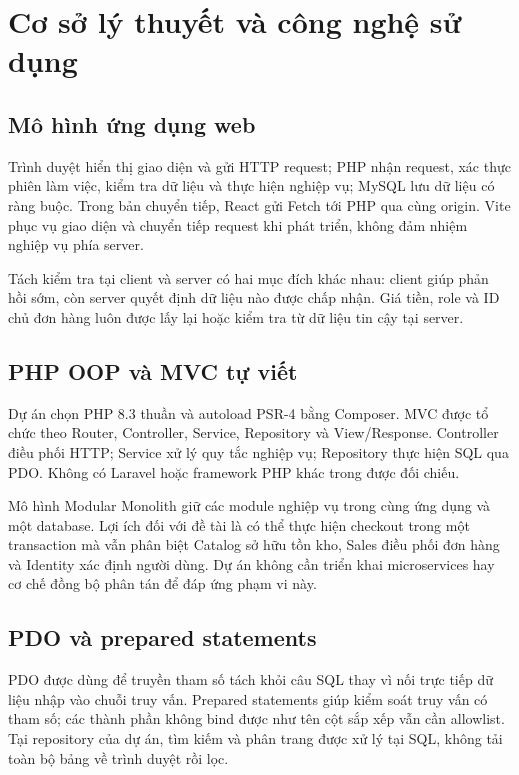 \section{Cơ sở lý thuyết và công nghệ sử dụng}
\subsection{Mô hình ứng dụng web}
Trình duyệt hiển thị giao diện và gửi HTTP request; PHP nhận request, xác thực phiên làm việc, kiểm tra dữ liệu và thực hiện nghiệp vụ; MySQL lưu dữ liệu có ràng buộc. Trong bản chuyển tiếp, React gửi Fetch tới PHP qua cùng origin. Vite phục vụ giao diện và chuyển tiếp request khi phát triển, không đảm nhiệm nghiệp vụ phía server.

Tách kiểm tra tại client và server có hai mục đích khác nhau: client giúp phản hồi sớm, còn server quyết định dữ liệu nào được chấp nhận. Giá tiền, role và ID chủ đơn hàng luôn được lấy lại hoặc kiểm tra từ dữ liệu tin cậy tại server.

\subsection{PHP OOP và MVC tự viết}
Dự án chọn PHP 8.3 thuần và autoload PSR-4 bằng Composer. MVC được tổ chức theo Router, Controller, Service, Repository và View/Response. Controller điều phối HTTP; Service xử lý quy tắc nghiệp vụ; Repository thực hiện SQL qua PDO. Không có Laravel hoặc framework PHP khác trong  được đối chiếu.

Mô hình Modular Monolith giữ các module nghiệp vụ trong cùng ứng dụng và một database. Lợi ích đối với đề tài là có thể thực hiện checkout trong một transaction mà vẫn phân biệt Catalog sở hữu tồn kho, Sales điều phối đơn hàng và Identity xác định người dùng. Dự án không cần triển khai microservices hay cơ chế đồng bộ phân tán để đáp ứng phạm vi này.

\subsection{PDO và prepared statements}
PDO được dùng để truyền tham số tách khỏi câu SQL thay vì nối trực tiếp dữ liệu nhập vào chuỗi truy vấn. Prepared statements giúp kiểm soát truy vấn có tham số; các thành phần không bind được như tên cột sắp xếp vẫn cần allowlist.\cite{php-pdo} Tại repository của dự án, tìm kiếm và phân trang được xử lý tại SQL, không tải toàn bộ bảng về trình duyệt rồi lọc.


